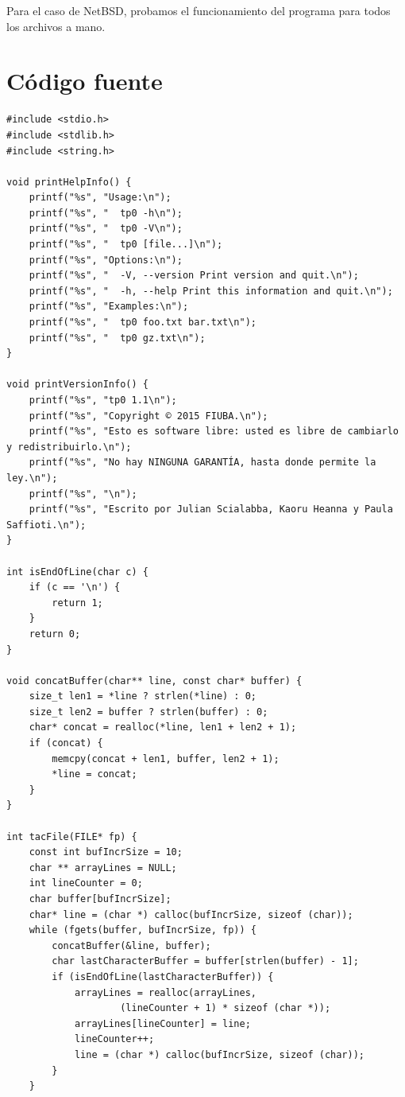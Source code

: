 \documentclass[a4paper,11pt]{article}
\begin{document}
Para el caso de NetBSD, probamos el funcionamiento del programa para todos los archivos a mano. 


\section{C\'odigo fuente}

\lstset{language=C, breaklines=true, basicstyle=\normalsize}
\begin{lstlisting}
#include <stdio.h>
#include <stdlib.h>
#include <string.h>

void printHelpInfo() {
    printf("%s", "Usage:\n");
    printf("%s", "	tp0 -h\n");
    printf("%s", "	tp0 -V\n");
    printf("%s", "	tp0 [file...]\n");
    printf("%s", "Options:\n");
    printf("%s", "	-V, --version Print version and quit.\n");
    printf("%s", "	-h, --help Print this information and quit.\n");
    printf("%s", "Examples:\n");
    printf("%s", "	tp0 foo.txt bar.txt\n");
    printf("%s", "	tp0 gz.txt\n");
}

void printVersionInfo() {
    printf("%s", "tp0 1.1\n");
    printf("%s", "Copyright © 2015 FIUBA.\n");
    printf("%s", "Esto es software libre: usted es libre de cambiarlo y redistribuirlo.\n");
    printf("%s", "No hay NINGUNA GARANTÍA, hasta donde permite la ley.\n");
    printf("%s", "\n");
    printf("%s", "Escrito por Julian Scialabba, Kaoru Heanna y Paula Saffioti.\n");
}

int isEndOfLine(char c) {
    if (c == '\n') {
        return 1;
    }
    return 0;
}

void concatBuffer(char** line, const char* buffer) {
    size_t len1 = *line ? strlen(*line) : 0;
    size_t len2 = buffer ? strlen(buffer) : 0;
    char* concat = realloc(*line, len1 + len2 + 1);
    if (concat) {
        memcpy(concat + len1, buffer, len2 + 1);
        *line = concat;
    }
}

int tacFile(FILE* fp) {
    const int bufIncrSize = 10;
    char ** arrayLines = NULL;
    int lineCounter = 0;
    char buffer[bufIncrSize];
    char* line = (char *) calloc(bufIncrSize, sizeof (char));
    while (fgets(buffer, bufIncrSize, fp)) {
        concatBuffer(&line, buffer);
        char lastCharacterBuffer = buffer[strlen(buffer) - 1];
        if (isEndOfLine(lastCharacterBuffer)) {
            arrayLines = realloc(arrayLines,
                    (lineCounter + 1) * sizeof (char *));
            arrayLines[lineCounter] = line;
            lineCounter++;
            line = (char *) calloc(bufIncrSize, sizeof (char));
        }
    }


\end{lstlisting}
\end{document}
